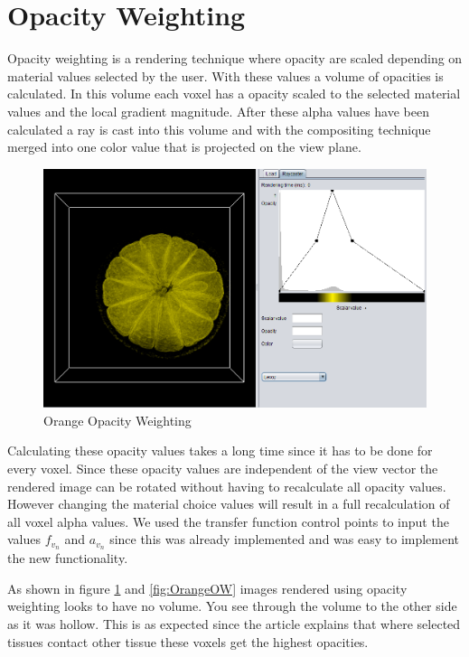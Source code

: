 \documentclass[a4paper,twoside,11pt]{article}
\begin{document}
\section{Opacity Weighting}
Opacity weighting is a rendering technique where opacity are scaled depending on material values selected by the user. With these values a volume of opacities is calculated. In this volume each voxel has a opacity scaled to the selected material values and the local gradient magnitude. After these alpha values have been calculated a ray is cast into this volume and with the compositing technique merged into one color value that is projected on the view plane.
\begin{figure}[h!]
    \includegraphics[width=\textwidth]{Images/OrangeOW.png}
    \caption{Orange Opacity Weighting}
    \label{fig:BonsaiOW}
\end{figure}
Calculating these opacity values takes a long time since it has to be done for every voxel. Since these opacity values are independent of the view vector the rendered image can be rotated without having to recalculate all opacity values. However changing the material choice values will result in a full recalculation of all voxel alpha values. We used the transfer function control points to input the values $f_{v_{n}}$ and $a_{v_{n}}$ since this was already implemented and was easy to implement the new functionality. \newpage

As shown in figure \ref{fig:BonsaiOW} and \ref{fig:OrangeOW} images rendered using opacity weighting looks to have no volume. You see through the volume to the other side as it was hollow. This is as expected since the article explains that where selected tissues contact other tissue these voxels get the highest opacities.
\end{document}
